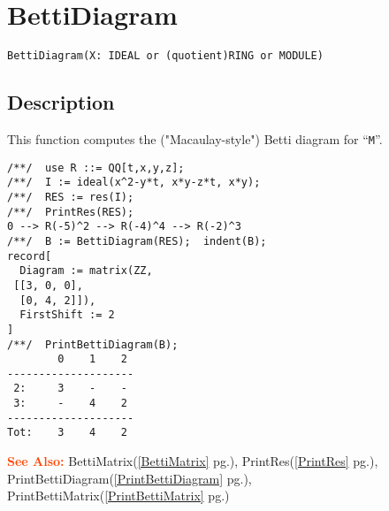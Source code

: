 \documentclass[a4paper]{mybook}
\newenvironment{command}{}{} %
\newcommand\SeeAlso{\par\textcolor{OrangeRed}{\textbf{\large See Also: }}}
\begin{document}
\section{BettiDiagram}
\label{BettiDiagram}
\begin{command} %


\begin{Verbatim}[label=syntax, rulecolor=\color{MidnightBlue},
frame=single]
BettiDiagram(X: IDEAL or (quotient)RING or MODULE)
\end{Verbatim}


\subsection*{Description}

This function computes the ("Macaulay-style") Betti
diagram for ``\verb&M&''.
\begin{Verbatim}[label=example, rulecolor=\color{PineGreen}, frame=single]
/**/  use R ::= QQ[t,x,y,z];
/**/  I := ideal(x^2-y*t, x*y-z*t, x*y);
/**/  RES := res(I);
/**/  PrintRes(RES);
0 --> R(-5)^2 --> R(-4)^4 --> R(-2)^3
/**/  B := BettiDiagram(RES);  indent(B);
record[
  Diagram := matrix(ZZ,
 [[3, 0, 0],
  [0, 4, 2]]),
  FirstShift := 2
]
/**/  PrintBettiDiagram(B);
        0    1    2
--------------------
 2:     3    -    -
 3:     -    4    2
--------------------
Tot:    3    4    2
\end{Verbatim}


\SeeAlso %
  BettiMatrix(\ref{BettiMatrix} pg.\pageref{BettiMatrix}), 
    PrintRes(\ref{PrintRes} pg.\pageref{PrintRes}), 
    PrintBettiDiagram(\ref{PrintBettiDiagram} pg.\pageref{PrintBettiDiagram}), 
    PrintBettiMatrix(\ref{PrintBettiMatrix} pg.\pageref{PrintBettiMatrix})
\end{command} %
\end{document}
